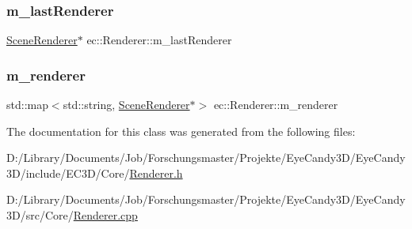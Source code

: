 \subsubsection{\texorpdfstring{m\+\_\+last\+Renderer}{m\_lastRenderer}}
{\footnotesize\ttfamily \mbox{\hyperlink{classec_1_1_scene_renderer}{Scene\+Renderer}}$\ast$ ec\+::\+Renderer\+::m\+\_\+last\+Renderer\hspace{0.3cm}{\ttfamily [protected]}}

\mbox{\label{classec_1_1_renderer_ac3f0c1c3253fbac0f734af313cc410a4}} 
\subsubsection{\texorpdfstring{m\+\_\+renderer}{m\_renderer}}
{\footnotesize\ttfamily std\+::map$<$std\+::string, \mbox{\hyperlink{classec_1_1_scene_renderer}{Scene\+Renderer}}$\ast$$>$ ec\+::\+Renderer\+::m\+\_\+renderer\hspace{0.3cm}{\ttfamily [protected]}}



The documentation for this class was generated from the following files\+:\begin{DoxyCompactItemize}
\item 
D\+:/\+Library/\+Documents/\+Job/\+Forschungsmaster/\+Projekte/\+Eye\+Candy3\+D/\+Eye\+Candy3\+D/include/\+E\+C3\+D/\+Core/\mbox{\hyperlink{_renderer_8h}{Renderer.\+h}}\item 
D\+:/\+Library/\+Documents/\+Job/\+Forschungsmaster/\+Projekte/\+Eye\+Candy3\+D/\+Eye\+Candy3\+D/src/\+Core/\mbox{\hyperlink{_renderer_8cpp}{Renderer.\+cpp}}\end{DoxyCompactItemize}
